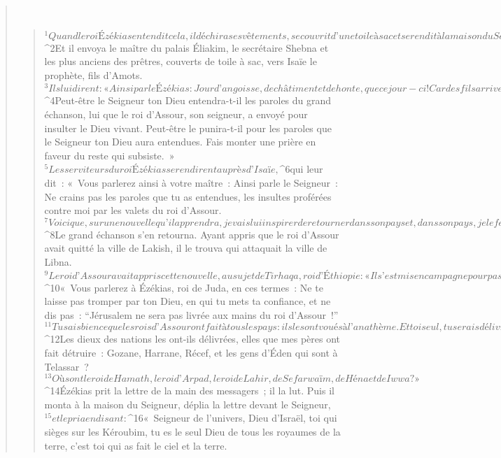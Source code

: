 \begin{verse}
         
      \bchapter{}
      \begin{verse}
${}^{1}Quand le roi Ézékias entendit cela, il déchira ses vêtements, se couvrit d’une toile à sac et se rendit à la maison du Seigneur. 
${}^{2}Et il envoya le maître du palais Éliakim, le secrétaire Shebna et les plus anciens des prêtres, couverts de toile à sac, vers Isaïe le prophète, fils d’Amots. 
${}^{3}Ils lui dirent : « Ainsi parle Ézékias : Jour d’angoisse, de châtiment et de honte, que ce jour-ci ! Car des fils arrivent à terme, et la force manque pour enfanter. 
${}^{4}Peut-être le Seigneur ton Dieu entendra-t-il les paroles du grand échanson, lui que le roi d’Assour, son seigneur, a envoyé pour insulter le Dieu vivant. Peut-être le punira-t-il pour les paroles que le Seigneur ton Dieu aura entendues. Fais monter une prière en faveur du reste qui subsiste. »
${}^{5}Les serviteurs du roi Ézékias se rendirent auprès d’Isaïe, 
${}^{6}qui leur dit : « Vous parlerez ainsi à votre maître : Ainsi parle le Seigneur : Ne crains pas les paroles que tu as entendues, les insultes proférées contre moi par les valets du roi d’Assour. 
${}^{7}Voici que, sur une nouvelle qu’il apprendra, je vais lui inspirer de retourner dans son pays et, dans son pays, je le ferai tomber par l’épée. »
${}^{8}Le grand échanson s’en retourna. Ayant appris que le roi d’Assour avait quitté la ville de Lakish, il le trouva qui attaquait la ville de Libna. 
${}^{9}Le roi d’Assour avait appris cette nouvelle, au sujet de Tirhaqa, roi d’Éthiopie : « Il s’est mis en campagne pour passer à l’attaque contre toi. »
      Quand le roi d’Assour l’apprit, il envoya des messagers dire à Ézékias : 
${}^{10}« Vous parlerez à Ézékias, roi de Juda, en ces termes : Ne te laisse pas tromper par ton Dieu, en qui tu mets ta confiance, et ne dis pas : “Jérusalem ne sera pas livrée aux mains du roi d’Assour !” 
${}^{11}Tu sais bien ce que les rois d’Assour ont fait à tous les pays : ils les ont voués à l’anathème. Et toi seul, tu serais délivré ? 
${}^{12}Les dieux des nations les ont-ils délivrées, elles que mes pères ont fait détruire : Gozane, Harrane, Récef, et les gens d’Éden qui sont à Telassar ? 
${}^{13}Où sont le roi de Hamath, le roi d’Arpad, le roi de Lahir, de Sefarwaïm, de Héna et de Iwwa ? »
${}^{14}Ézékias prit la lettre de la main des messagers ; il la lut. Puis il monta à la maison du Seigneur, déplia la lettre devant le Seigneur, 
${}^{15}et le pria en disant : 
${}^{16}« Seigneur de l’univers, Dieu d’Israël, toi qui sièges sur les Kéroubim, tu es le seul Dieu de tous les royaumes de la terre, c’est toi qui as fait le ciel et la terre. 

\end{verse}
\end{verse}
